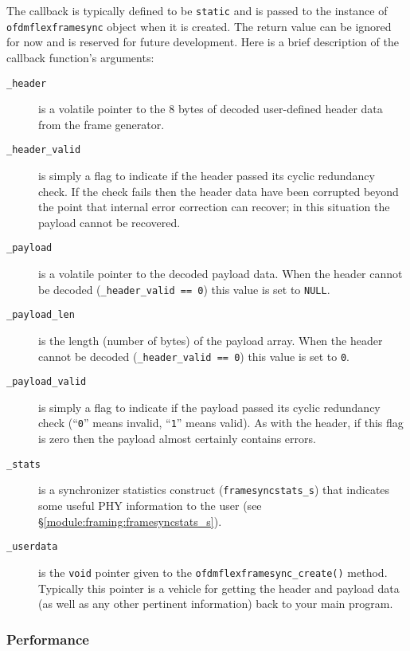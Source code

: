 %
The callback is typically defined to be {\tt static} and is passed to
the instance of {\tt ofdmflexframesync} object when it is created.
The return value can be ignored for now and is reserved for future
development.
Here is a brief description of the callback function's arguments:
%
\begin{description}
\item[{\tt \_header}]
    is a volatile pointer to the 8 bytes of decoded user-defined header
    data from the frame generator.
\item[{\tt \_header\_valid}]
    is simply a flag to indicate if the header passed its cyclic
    redundancy check.
    If the check fails then the header data have been corrupted beyond
    the point that internal error correction can recover;
    in this situation the payload cannot be recovered.
\item[{\tt \_payload}]
    is a volatile pointer to the decoded payload data.
    When the header cannot be decoded ({\tt \_header\_valid == 0})
    this value is set to {\tt NULL}.
\item[{\tt \_payload\_len}]
    is the length (number of bytes) of the payload array.
    When the header cannot be decoded ({\tt \_header\_valid == 0})
    this value is set to {\tt 0}.
\item[{\tt \_payload\_valid}]
    is simply a flag to indicate if the payload passed its cyclic
    redundancy check
    (``{\tt 0}'' means invalid, ``{\tt 1}'' means valid).
    As with the header,
    if this flag is zero then the payload almost certainly contains
    errors.
\item[{\tt \_stats}]
    is a synchronizer statistics construct
    ({\tt framesyncstats\_s})
    that indicates some useful PHY information to the user
    (see \S\ref{module:framing:framesyncstats_s}).
\item[{\tt \_userdata}]
    is the {\tt void} pointer given to the
    {\tt ofdmflexframesync\_create()} method.
    Typically this pointer is a vehicle for getting the header and
    payload data (as well as any other pertinent information)
    back to your main program.
\end{description}
%

\subsubsection{Performance}
\label{module:framing:ofdmflexframe:performance}
%

